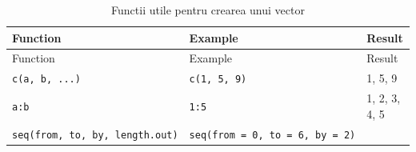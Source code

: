 \documentclass[]{article}
\begin{document}
\begin{longtable}[]{@{}lll@{}}
\caption{Functii utile pentru crearea unui vector}\tabularnewline
\toprule
\begin{minipage}[b]{0.35\columnwidth}\raggedright
Function\strut
\end{minipage} & \begin{minipage}[b]{0.41\columnwidth}\raggedright
Example\strut
\end{minipage} & \begin{minipage}[b]{0.15\columnwidth}\raggedright
Result\strut
\end{minipage}\tabularnewline
\midrule
\endfirsthead
\toprule
\begin{minipage}[b]{0.35\columnwidth}\raggedright
Function\strut
\end{minipage} & \begin{minipage}[b]{0.41\columnwidth}\raggedright
Example\strut
\end{minipage} & \begin{minipage}[b]{0.15\columnwidth}\raggedright
Result\strut
\end{minipage}\tabularnewline
\midrule
\endhead
\begin{minipage}[t]{0.35\columnwidth}\raggedright
\texttt{c(a,\ b,\ ...)}\strut
\end{minipage} & \begin{minipage}[t]{0.41\columnwidth}\raggedright
\texttt{c(1,\ 5,\ 9)}\strut
\end{minipage} & \begin{minipage}[t]{0.15\columnwidth}\raggedright
1, 5, 9\strut
\end{minipage}\tabularnewline
\begin{minipage}[t]{0.35\columnwidth}\raggedright
\texttt{a:b}\strut
\end{minipage} & \begin{minipage}[t]{0.41\columnwidth}\raggedright
\texttt{1:5}\strut
\end{minipage} & \begin{minipage}[t]{0.15\columnwidth}\raggedright
1, 2, 3, 4, 5\strut
\end{minipage}\tabularnewline
\begin{minipage}[t]{0.35\columnwidth}\raggedright
\texttt{seq(from,\ to,\ by,\ length.out)}\strut
\end{minipage} & \begin{minipage}[t]{0.41\columnwidth}\raggedright
\texttt{seq(from\ =\ 0,\ to\ =\ 6,\ by\ =\ 2)}\strut
\end{minipage} & \begin{minipage}[t]{0.15\columnwidth}\raggedright

\end{minipage}
\end{longtable}
\end{document}
